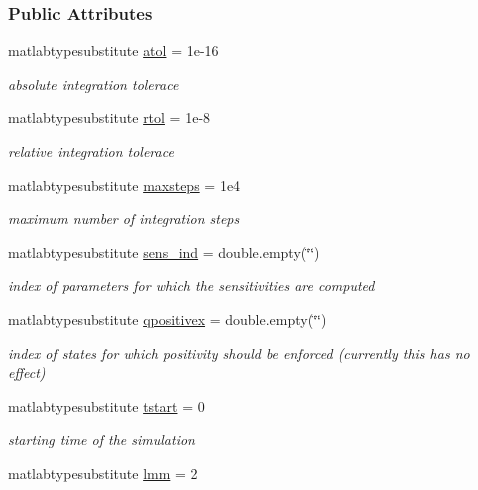 \subsubsection*{Public Attributes}
\begin{DoxyCompactItemize}
\item 
matlabtypesubstitute \hyperlink{classamioption_a0c5f3dcf809a17b895fe12fc91272349}{atol} = 1e-\/16
\begin{DoxyCompactList}\small\item\em absolute integration tolerace \end{DoxyCompactList}\item 
matlabtypesubstitute \hyperlink{classamioption_a7978e9a4674f869e6b2950e2f6262ca5}{rtol} = 1e-\/8
\begin{DoxyCompactList}\small\item\em relative integration tolerace \end{DoxyCompactList}\item 
matlabtypesubstitute \hyperlink{classamioption_ac37622882dacee1f11688d4941ccb45e}{maxsteps} = 1e4
\begin{DoxyCompactList}\small\item\em maximum number of integration steps \end{DoxyCompactList}\item 
matlabtypesubstitute \hyperlink{classamioption_a0505783cf66f362672cbe3320d47a94d}{sens\+\_\+ind} = double.\+empty(\char`\"{}\char`\"{})
\begin{DoxyCompactList}\small\item\em index of parameters for which the sensitivities are computed \end{DoxyCompactList}\item 
matlabtypesubstitute \hyperlink{classamioption_a8938c19fd7067f4780be8255764210b7}{qpositivex} = double.\+empty(\char`\"{}\char`\"{})
\begin{DoxyCompactList}\small\item\em index of states for which positivity should be enforced (currently this has no effect) \end{DoxyCompactList}\item 
matlabtypesubstitute \hyperlink{classamioption_a18a69d8713604897ca9ee705d9d4fc4a}{tstart} = 0
\begin{DoxyCompactList}\small\item\em starting time of the simulation \end{DoxyCompactList}\item 
matlabtypesubstitute \hyperlink{classamioption_a6f4b21b13e0c8c531c452c70b43fc96a}{lmm} = 2

\end{DoxyCompactItemize}
